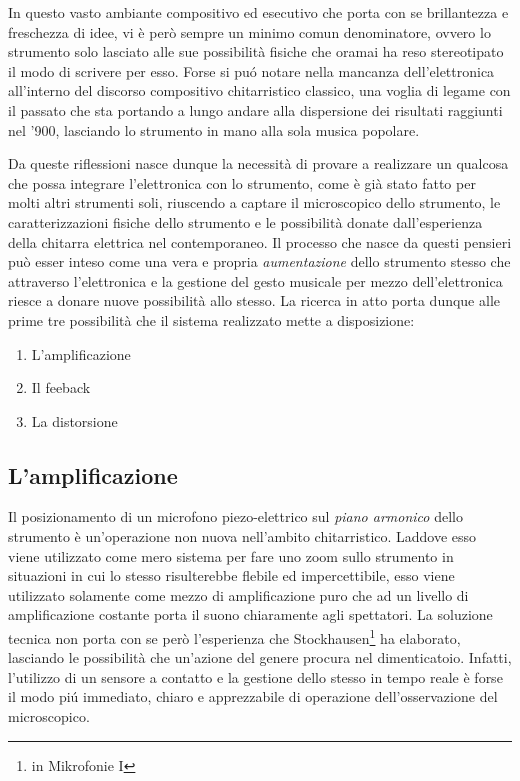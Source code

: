 \documentclass[oneside]{article}
\begin{document}
\begin{multicols*}{2}
In questo vasto ambiante compositivo ed esecutivo che porta con se brillantezza e freschezza di idee, vi è però sempre un minimo comun denominatore, ovvero lo strumento solo lasciato alle sue possibilità fisiche che oramai ha reso stereotipato il modo di scrivere per esso. Forse si puó notare nella mancanza dell'elettronica all'interno del discorso compositivo chitarristico classico, una voglia di legame con il passato che sta portando a lungo andare alla dispersione dei risultati raggiunti nel '900, lasciando lo strumento in mano alla sola musica popolare. 

\noindent Da queste riflessioni nasce dunque la necessità di provare a realizzare un qualcosa che possa integrare l'elettronica con lo strumento, come è già stato fatto per molti altri strumenti soli, riuscendo a captare il microscopico dello strumento, le caratterizzazioni fisiche dello strumento e le possibilità donate dall'esperienza della chitarra elettrica nel contemporaneo. Il processo che nasce da questi pensieri può esser inteso come una vera e propria \textit{aumentazione} dello strumento stesso che attraverso l'elettronica e la gestione del gesto musicale per mezzo dell'elettronica riesce a donare nuove possibilità allo stesso. La ricerca in atto porta dunque alle prime tre possibilità che il sistema realizzato mette a disposizione: 
\begin{enumerate}[label=(\roman*)]
\item L'amplificazione
\item Il feeback 
\item La distorsione
\end{enumerate}

\subsection{L'amplificazione} 
Il posizionamento di un microfono piezo-elettrico sul \textit{piano armonico} dello strumento è un'operazione non nuova nell'ambito chitarristico. Laddove esso viene utilizzato come mero sistema per fare uno zoom sullo strumento in situazioni in cui lo stesso risulterebbe flebile ed impercettibile, esso viene utilizzato solamente come mezzo di amplificazione puro che ad un livello di amplificazione costante porta il suono chiaramente agli spettatori. La soluzione tecnica non porta con se però l'esperienza che Stockhausen\footnote{in Mikrofonie I} ha elaborato, lasciando le possibilità che un'azione del genere procura nel dimenticatoio. Infatti, l'utilizzo di un sensore a contatto e la gestione dello stesso in tempo reale è forse il modo piú immediato, chiaro e apprezzabile di operazione dell'osservazione del microscopico.


\end{multicols*}
\end{document}
